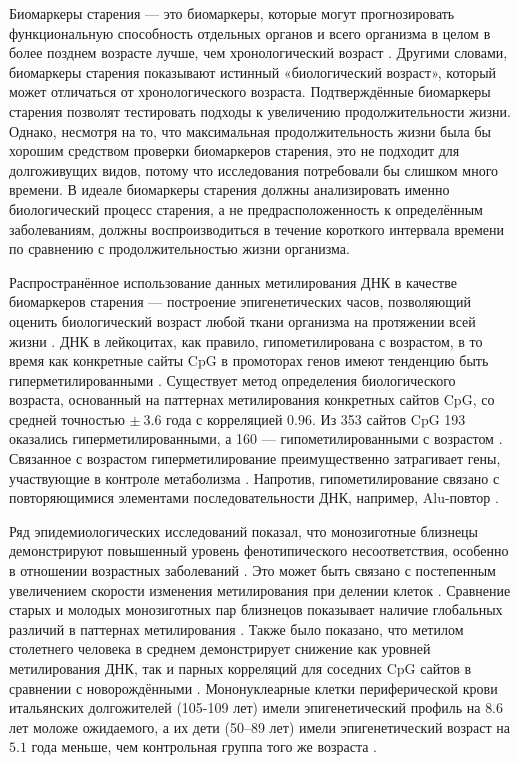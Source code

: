 Биомаркеры старения --- это биомаркеры, которые могут прогнозировать функциональную способность отдельных органов и всего организма в целом в более позднем возрасте лучше, чем хронологический возраст \autocite{Baker1988}. Другими словами, биомаркеры старения показывают истинный «биологический возраст», который может отличаться от хронологического возраста. Подтверждённые биомаркеры старения позволят тестировать подходы к увеличению продолжительности жизни. Однако, несмотря на то, что максимальная продолжительность жизни была бы хорошим средством проверки биомаркеров старения, это не подходит для долгоживущих видов, потому что исследования потребовали бы слишком много времени. В идеале биомаркеры старения должны анализировать именно биологический процесс старения, а не предрасположенность к определённым заболеваниям, должны воспроизводиться в течение короткого интервала времени по сравнению с продолжительностью жизни организма.

Распространённое использование данных метилирования ДНК в качестве биомаркеров старения --- построение эпигенетических часов, позволяющий оценить биологический возраст любой ткани организма на протяжении всей жизни \autocite{Horvath2018}. ДНК в лейкоцитах, как правило, гипометилирована с возрастом, в то время как конкретные сайты CpG в промоторах генов имеют тенденцию быть гиперметилированными \autocite{Heyn2012, Gentilini2012}. Существует метод определения биологического возраста, основанный на паттернах метилирования конкретных сайтов CpG, со средней точностью $\pm~3.6$ года с корреляцией $0.96$. Из 353 сайтов CpG 193 оказались гиперметилированными, а 160 --- гипометилированными с возрастом \autocite{Horvath2013}. Связанное с возрастом гиперметилирование преимущественно затрагивает гены, участвующие в контроле метаболизма \autocite{Gentilini2012, Christensen2009}. Напротив, гипометилирование связано с повторяющимися элементами последовательности ДНК, например, Alu-повтор \autocite{Gentilini2012}.

Ряд эпидемиологических исследований показал, что монозиготные близнецы демонстрируют повышенный уровень фенотипического несоответствия, особенно в отношении возрастных заболеваний \autocite{Frederiksen2002, Reynolds2005, Zwijnenburg2010, CastilloFernandez2014}. Это может быть связано с постепенным увеличением скорости изменения метилирования при делении клеток \autocite{Issa2014}. Сравнение старых и молодых монозиготных пар близнецов показывает наличие глобальных различий в паттернах метилирования \autocite{Levesque2014, Tan2016, Wang2018Twins}. Также было показано, что метилом столетнего человека в среднем демонстрирует снижение как уровней метилирования ДНК, так и парных корреляций для соседних CpG сайтов в сравнении с новорождёнными \autocite{Heyn2012}. Мононуклеарные клетки периферической крови итальянских долгожителей (105-109 лет) имели эпигенетический профиль на $8.6$ лет моложе ожидаемого, а их дети (50–89 лет) имели эпигенетический возраст на $5.1$ года меньше, чем контрольная группа того же возраста \autocite{Horvath2015}.

